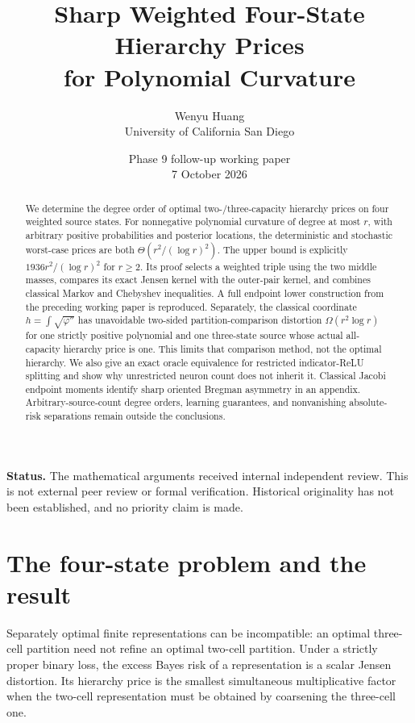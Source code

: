 \documentclass[11pt]{article}
\title{Sharp Weighted Four-State Hierarchy Prices\\ for Polynomial Curvature}
\author{Wenyu Huang\\\small University of California San Diego}
\date{Phase 9 follow-up working paper\\7 October 2026}
\theoremstyle{definition}\newtheorem{definition}[theorem]{Definition}
\theoremstyle{remark}\newtheorem{remark}[theorem]{Remark}
\begin{document}
\maketitle
\begin{center}\begin{minipage}{0.92\textwidth}\small
\textbf{Status.} The mathematical arguments received internal independent
review. This is not external peer review or formal verification. Historical
originality has not been established, and no priority claim is made.
\end{minipage}\end{center}

\begin{abstract}
We determine the degree order of optimal two-/three-capacity hierarchy
prices on four weighted source states. For nonnegative polynomial curvature
of degree at most $r$, with arbitrary positive probabilities and posterior
locations, the deterministic and stochastic worst-case prices are both
$\Theta(r^2/(\log r)^2)$. The upper bound is explicitly
$1936r^2/(\log r)^2$ for $r\ge2$. Its proof selects a weighted triple using
the two middle masses, compares its exact Jensen kernel with the outer-pair
kernel, and combines classical Markov and Chebyshev inequalities. A full
endpoint lower construction from the preceding working paper is reproduced.
Separately, the classical coordinate $h=\int\sqrt{\varphi''}$ has unavoidable
two-sided partition-comparison distortion $\Omega(r^2\log r)$ for one
strictly positive polynomial and one three-state source whose actual
all-capacity hierarchy price is one. This limits that comparison method,
not the optimal hierarchy. We also give an exact oracle equivalence for
restricted indicator-ReLU splitting and show why unrestricted neuron count
does not inherit it. Classical Jacobi endpoint moments identify sharp
oriented Bregman asymmetry in an appendix. Arbitrary-source-count degree
orders, learning guarantees, and nonvanishing absolute-risk separations
remain outside the conclusions.
\end{abstract}

\section{The four-state problem and the result}
Separately optimal finite representations can be incompatible: an optimal
three-cell partition need not refine an optimal two-cell partition.
Under a strictly proper binary loss, the excess Bayes risk of a
representation is a scalar Jensen distortion. Its hierarchy price is the
smallest simultaneous multiplicative factor when the two-cell
representation must be obtained by coarsening the three-cell one.
\end{document}
